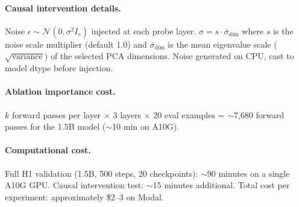 \paragraph{Causal intervention details.}
Noise $\epsilon \sim \mathcal{N}(0, \sigma^2 I_r)$ injected at each probe layer.
$\sigma = s \cdot \bar{\sigma}_{\text{dim}}$ where $s$ is the noise scale multiplier (default 1.0) and $\bar{\sigma}_{\text{dim}}$ is the mean eigenvalue scale ($\sqrt{\text{variance}}$) of the selected PCA dimensions.
Noise generated on CPU, cast to model dtype before injection.

\paragraph{Ablation importance cost.}
$k$ forward passes per layer $\times$ 3 layers $\times$ 20 eval examples = $\sim$7{,}680 forward passes for the 1.5B model ($\sim$10 min on A10G).

\paragraph{Computational cost.}
Full H1 validation (1.5B, 500 steps, 20 checkpoints): $\sim$90 minutes on a single A10G GPU.
Causal intervention test: $\sim$15 minutes additional.
Total cost per experiment: approximately \$2--3 on Modal.
